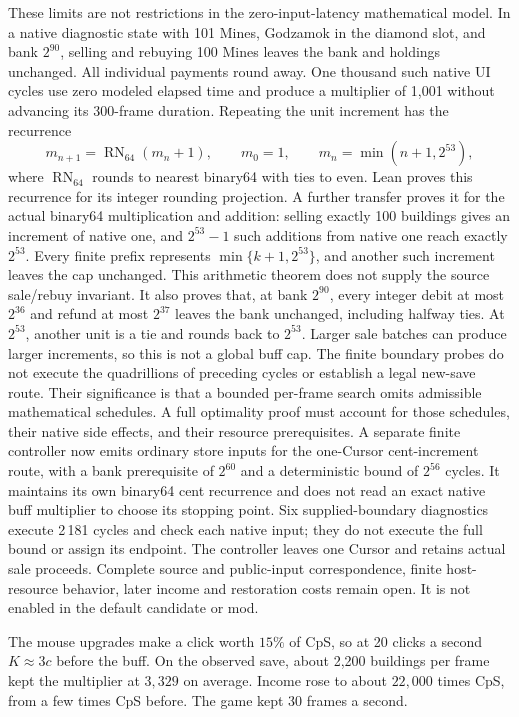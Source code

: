\documentclass[11pt,a4paper]{article}
\numberwithin{equation}{section}
\theoremstyle{definition}
\theoremstyle{remark}
\begin{document}
These limits are not restrictions in the zero-input-latency mathematical model. In a native diagnostic state with 101 Mines, Godzamok in the diamond slot, and bank $2^{90}$, selling and rebuying 100 Mines leaves the bank and holdings unchanged. All individual payments round away. One thousand such native UI cycles use zero modeled elapsed time and produce a multiplier of 1,001 without advancing its 300-frame duration. Repeating the unit increment has the recurrence
\[
 m_{n+1}=\operatorname{RN}_{64}(m_n+1),\qquad m_0=1,
 \qquad m_n=\min(n+1,2^{53}),
\]
where $\operatorname{RN}_{64}$ rounds to nearest binary64 with ties to even. Lean proves this recurrence for its integer rounding projection. A further transfer proves it for the actual binary64 multiplication and addition: selling exactly 100 buildings gives an increment of native one, and $2^{53}-1$ such additions from native one reach exactly $2^{53}$. Every finite prefix represents $\min\{k+1,2^{53}\}$, and another such increment leaves the cap unchanged. This arithmetic theorem does not supply the source sale/rebuy invariant. It also proves that, at bank $2^{90}$, every integer debit at most $2^{36}$ and refund at most $2^{37}$ leaves the bank unchanged, including halfway ties. At $2^{53}$, another unit is a tie and rounds back to $2^{53}$. Larger sale batches can produce larger increments, so this is not a global buff cap. The finite boundary probes do not execute the quadrillions of preceding cycles or establish a legal new-save route. Their significance is that a bounded per-frame search omits admissible mathematical schedules. A full optimality proof must account for those schedules, their native side effects, and their resource prerequisites. A separate finite controller now emits ordinary store inputs for the one-Cursor cent-increment route, with a bank prerequisite of $2^{60}$ and a deterministic bound of $2^{56}$ cycles. It maintains its own binary64 cent recurrence and does not read an exact native buff multiplier to choose its stopping point. Six supplied-boundary diagnostics execute 2\,181 cycles and check each native input; they do not execute the full bound or assign its endpoint. The controller leaves one Cursor and retains actual sale proceeds. Complete source and public-input correspondence, finite host-resource behavior, later income and restoration costs remain open. It is not enabled in the default candidate or mod.

The mouse upgrades make a click worth $15\%$ of CpS, so at 20 clicks a second $K\approx3c$ before the buff. On the observed save, about 2{,}200 buildings per frame kept the multiplier at $3{,}329$ on average. Income rose to about $22{,}000$ times CpS, from a few times CpS before. The game kept 30 frames a second.
\end{document}
